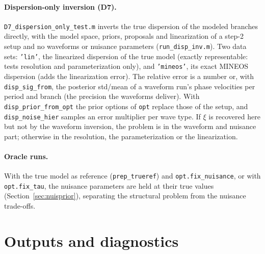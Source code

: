 \documentclass[11pt]{article}
\begin{document}
\paragraph{Dispersion-only inversion (D7).} \texttt{D7\_dispersion\_only\_test.m}
inverts the true dispersion of the modeled branches directly, with the
model space, priors, proposals and linearization of a step-2 setup and no
waveforms or nuisance parameters (\texttt{run\_disp\_inv.m}). Two data
sets: \texttt{'lin'}, the linearized dispersion of the true model (exactly
representable: tests resolution and parameterization only), and
\texttt{'mineos'}, its exact MINEOS dispersion (adds the linearization
error). The relative error is a number or, with \texttt{disp\_sig\_from},
the posterior std/mean of a waveform run's phase velocities per period and
branch (the precision the waveforms deliver). With
\texttt{disp\_prior\_from\_opt} the prior options of \texttt{opt} replace
those of the setup, and \texttt{disp\_noise\_hier} samples an error
multiplier per wave type. If $\xi$ is recovered here but not by the
waveform inversion, the problem is in the waveform and nuisance part;
otherwise in the resolution, the parameterization or the linearization.

\paragraph{Oracle runs.} With the true model as reference
(\texttt{prep\_trueref}) and \texttt{opt.fix\_nuisance}, or with
\texttt{opt.fix\_tau}, the nuisance parameters are held at their true
values (Section~\ref{sec:nuisprior}), separating the structural problem
from the nuisance trade-offs.

\section{Outputs and diagnostics}\label{sec:out}
\end{document}
